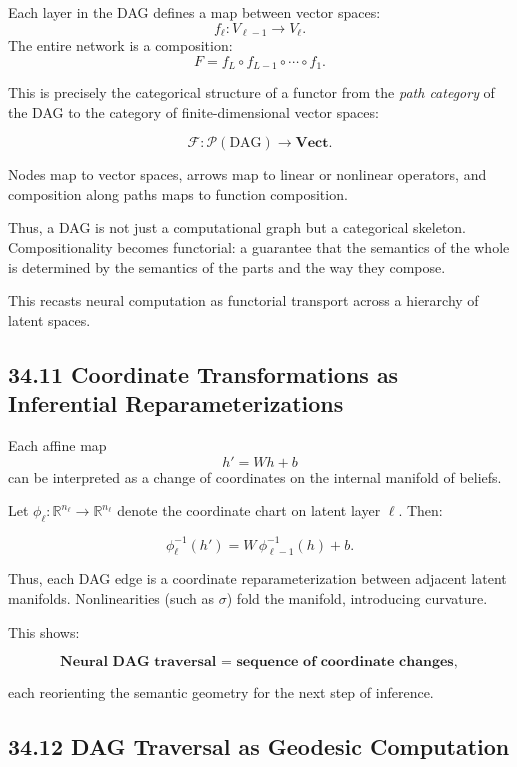 \documentclass[12pt,letterpaper]{article}
\theoremstyle{remark}
\begin{document}
Each layer in the DAG defines a map between vector spaces:
\[
f_\ell : V_{\ell-1} \to V_\ell.
\]
The entire network is a composition:
\[
F = f_L \circ f_{L-1} \circ \cdots \circ f_1.
\]

This is precisely the categorical structure of a functor from the \emph{path category} of the DAG to the category of finite-dimensional vector spaces:

\[
\mathcal{F} : \mathcal{P}(\text{DAG}) \to \mathbf{Vect}.
\]

Nodes map to vector spaces, arrows map to linear or nonlinear operators, and composition along paths maps to function composition.

Thus, a DAG is not just a computational graph but a categorical skeleton. Compositionality becomes functorial: a guarantee that the semantics of the whole is determined by the semantics of the parts and the way they compose.

This recasts neural computation as functorial transport across a hierarchy of latent spaces.

\subsection{34.11 Coordinate Transformations as Inferential Reparameterizations}

Each affine map
\[
h' = W h + b
\]
can be interpreted as a change of coordinates on the internal manifold of beliefs.

Let $\phi_\ell : \mathbb{R}^{n_\ell} \to \mathbb{R}^{n_\ell}$ denote the coordinate chart on latent layer $\ell$. Then:

\[
\phi_\ell^{-1}(h') = W\, \phi_{\ell-1}^{-1}(h) + b.
\]

Thus, each DAG edge is a coordinate reparameterization between adjacent latent manifolds.  
Nonlinearities (such as $\sigma$) fold the manifold, introducing curvature.

This shows:

\[
\textbf{Neural DAG traversal = sequence of coordinate changes},
\]

each reorienting the semantic geometry for the next step of inference.

\subsection{34.12 DAG Traversal as Geodesic Computation}
\end{document}
